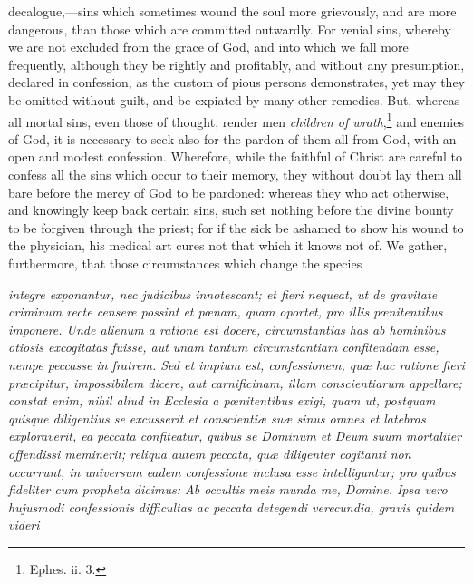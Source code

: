 decalogue,—sins which sometimes wound the soul more grievously, and are more dangerous, than those which are committed outwardly. For venial sins, whereby we are not excluded from the grace of God, and into which we fall more frequently, although they be rightly and profitably, and without any presumption, declared in confession, as the custom of pious persons demonstrates, yet may they be omitted without guilt, and be expiated by many other remedies. But, whereas all mortal sins, even those of thought, render men \emph{children of wrath},\footnote{\par  Ephes. ii. 3.} and enemies of God, it is necessary to seek also for the pardon of them all from God, with an open and modest confession. Wherefore, while the faithful of Christ are careful to confess all the sins which occur to their memory, they without doubt lay them all bare before the mercy of God to be pardoned: whereas they who act otherwise, and knowingly keep back certain sins, such set nothing before the divine bounty to be forgiven through the priest; for if the sick be ashamed to show his wound to the physician, his medical art cures not that which it knows not of. We gather, furthermore, that those circumstances which change the species

\emph{integre exponantur, nec judicibus innotescant; et fieri nequeat, ut de gravitate criminum recte censere possint et pœnam, quam oportet, pro illis pœnitentibus imponere. Unde alienum a ratione est docere, circumstantias has ab hominibus otiosis excogitatas fuisse, aut unam tantum circumstantiam confitendam esse, nempe peccasse in fratrem. Sed et impium est, confessionem, quæ hac ratione fieri præcipitur, impossibilem dicere, aut carnificinam, illam conscientiarum appellare; constat enim, nihil aliud in Ecclesia a pœnitentibus exigi, quam ut, postquam quisque diligentius se excusserit et conscientiæ suæ sinus omnes et latebras exploraverit, ea peccata confiteatur, quibus se Dominum et Deum suum mortaliter offendissi meminerit; reliqua autem peccata, quæ diligenter cogitanti non occurrunt, in universum eadem confessione inclusa esse intelliguntur; pro quibus fideliter cum propheta dicimus: Ab occultis meis munda me, Domine. Ipsa vero hujusmodi confessionis difficultas ac peccata detegendi verecundia, gravis quidem videri }


